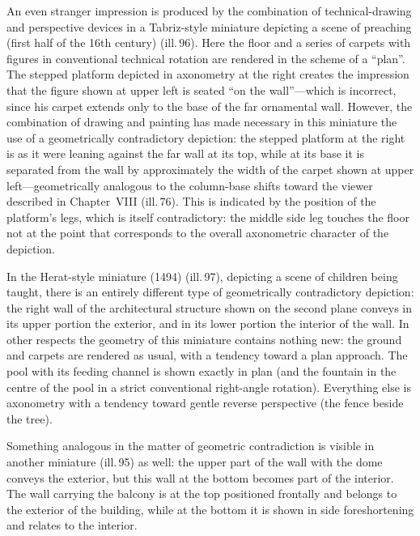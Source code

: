 An even stranger impression is produced by the combination of technical-drawing and
perspective devices in a Tabriz-style miniature depicting a scene of preaching
(first half of the 16th century) (ill.\,96). Here the floor and a series of carpets
with figures in conventional technical rotation are rendered in the scheme of a
``plan''. The stepped platform depicted in axonometry at the right creates the
impression that the figure shown at upper left is seated ``on the wall''---which is
incorrect, since his carpet extends only to the base of the far ornamental wall.
However, the combination of drawing and painting has made necessary in this
miniature the use of a geometrically contradictory depiction: the stepped platform
at the right is as it were leaning against the far wall at its top, while at its
base it is separated from the wall by approximately the width of the carpet shown
at upper left---geometrically analogous to the column-base shifts toward the viewer
described in Chapter~VIII (ill.\,76). This is indicated by the position of the
platform's legs, which is itself contradictory: the middle side leg touches the
floor not at the point that corresponds to the overall axonometric character of the
depiction.





In the Herat-style miniature (1494) (ill.\,97), depicting a scene of children
being taught, there is an entirely different type of geometrically contradictory
depiction: the right wall of the architectural structure shown on the second plane
conveys in its upper portion the exterior, and in its lower portion the interior of
the wall. In other respects the geometry of this miniature contains nothing new:
the ground and carpets are rendered as usual, with a tendency toward a plan
approach. The pool with its feeding channel is shown exactly in plan (and the
fountain in the centre of the pool in a strict conventional right-angle rotation).
Everything else is axonometry with a tendency toward gentle reverse perspective
(the fence beside the tree).

Something analogous in the matter of geometric contradiction is visible in another
miniature (ill.\,95) as well: the upper part of the wall with the dome conveys the
exterior, but this wall at the bottom becomes part of the interior. The wall
carrying the balcony is at the top positioned frontally and belongs to the exterior
of the building, while at the bottom it is shown in side foreshortening and relates
to the interior.


